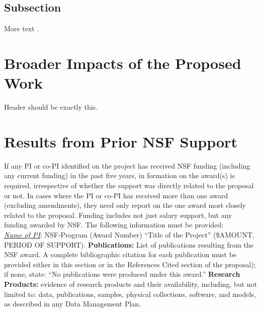 \documentclass{DOEproposal}
\begin{document}
\subsection{Subsection}
More text \citep{Grapenthin2006}.

\section{Broader Impacts of the Proposed Work}
Header should be exactly this. 

\section{Results from Prior NSF Support}
If any PI or co-PI identified on the project has received NSF funding (including any current
funding) in the past five years, in formation on the award(s) is required,
irrespective of whether the support was directly related to the proposal or not.
In cases where the PI or co-PI has received more than one award (excluding amendments),
they need only report on the one award most closely related to the proposal. Funding includes not just salary
support, but any funding awarded by NSF. The following information must be provided:\\

\noindent
\emph{\underline{Name of PI}}: NSF-Program (Award Number) ``Title of the Project'' (\$AMOUNT, PERIOD OF SUPPORT). 
{\bf Publications:} List of publications resulting from the NSF award. A complete bibliographic citation for each
publication must be provided either in this section or in the References Cited section of the proposal); if
none, state: ``No publications were produced under this award.'' {\bf Research Products:} evidence of research products 
and their availability, including, but not limited to: data, publications, samples, physical collections, software, 
and models, as described in any Data Management Plan.


\newpage
{}
\renewcommand{\thepage} {E--\arabic{page}}






\newpage
{}
\renewcommand{\thepage} {F--\arabic{page}}
\end{document}
